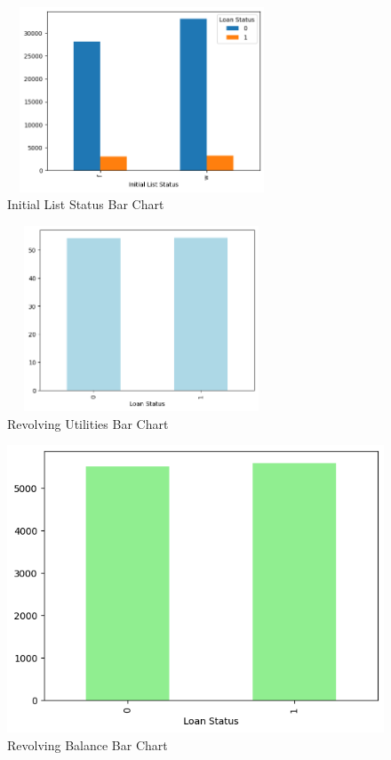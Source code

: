 \documentclass[sigplan]{acmart}
\begin{document}
\begin{figure}[h]
    \includegraphics[width=8cm, height = 5.5cm]{images/initial list status.png}
    \caption{Initial List Status Bar Chart}
\end{figure}

\begin{figure}[h]
    \includegraphics[width=8cm, height = 5.5cm]{images/revolving utilities.png}
    \caption{Revolving Utilities Bar Chart}
\end{figure}

\begin{figure}[h]
    \centering
    \includegraphics[width=\linewidth]{images/revolving balance.png}
    \caption{Revolving Balance Bar Chart}
\end{figure}
\end{document}
